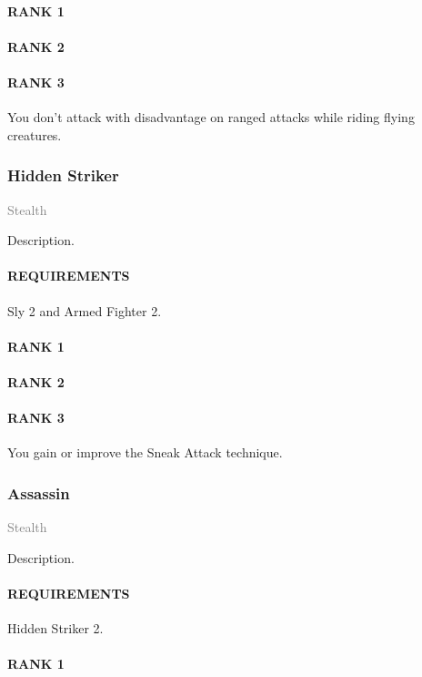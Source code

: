 \paragraph{RANK 1}
\paragraph{RANK 2}
\paragraph{RANK 3} You don't attack with disadvantage on ranged attacks while riding flying creatures.

\subsubsection{Hidden Striker} \label{feat::hiddenstriker} %
\small{\textcolor{gray}{Stealth}}

\normalsize
Description.
\paragraph{REQUIREMENTS} Sly 2 and Armed Fighter 2.
\paragraph{RANK 1}
\paragraph{RANK 2}
\paragraph{RANK 3} You gain or improve the Sneak Attack technique.

\subsubsection{Assassin} \label{feat::assassin} %
\small{\textcolor{gray}{Stealth}}

\normalsize
Description.
\paragraph{REQUIREMENTS} Hidden Striker 2.
\paragraph{RANK 1}
